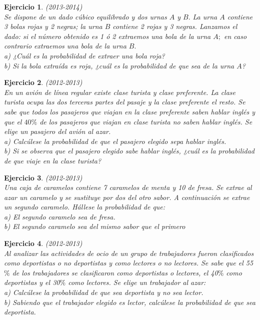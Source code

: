 \documentclass[12pt, a4paper]{amsart}
\newtheorem{ejer}{Ejercicio}
\begin{document}
\begin{ejer}\em (2013-2014)\\
Se dispone de un dado cúbico equilibrado y dos urnas $A$ y $B.$ La urna $A$ contiene 3 bolas rojas y 2 negras; la urna $B$ contiene 2 rojas y 3 negras. Lanzamos el dado: si el número obtenido es 1 ó 2 extraemos una bola de la urna $A;$ en caso contrario extraemos una bola de la urna $B.$\\
a) ¿Cuál es la probabilidad de extraer una bola roja?\\
b) Si la bola extraída es roja, ¿cuál es la probabilidad de que sea de la urna $A$?
\end{ejer}

\begin{ejer}\em (2012-2013)\\
En un avión de línea regular existe clase turista y clase preferente. La clase turista ocupa las dos terceras
partes del pasaje y la clase preferente el resto. Se sabe que todos los pasajeros que viajan en la clase
preferente saben hablar inglés y que el $40\%$ de los pasajeros que viajan en clase turista no saben hablar
inglés. Se elige un pasajero del avión al azar.\\
a) Calcúlese la probabilidad de que el pasajero elegido sepa hablar inglés.\\
b) Si se observa que el pasajero elegido sabe hablar inglés, ¿cuál es la probabilidad de que viaje en la clase
turista?
\end{ejer}

\begin{ejer}\em (2012-2013)\\
Una caja de caramelos contiene 7 caramelos de menta y 10 de fresa. Se extrae al azar un caramelo y se
sustituye por dos del otro sabor. A continuación se extrae un segundo caramelo. Hállese la probabilidad
de que:\\
a) El segundo caramelo sea de fresa.\\
b) El segundo caramelo sea del mismo sabor que el primero
\end{ejer}

\begin{ejer}\em (2012-2013)\\
Al analizar las actividades de ocio de un grupo de trabajadores fueron clasificados como deportistas o
no deportistas y como lectores o no lectores. Se sabe que el 55$\%$ de los trabajadores se clasificaron como
deportistas o lectores, el 40$\%$ como deportistas y el 30$\%$ como lectores. Se elige un trabajador al azar:\\
a) Calcúlese la probabilidad de que sea deportista y no sea lector.\\
b) Sabiendo que el trabajador elegido es lector, calcúlese la probabilidad de que sea deportista.
\end{ejer}
\end{document}
